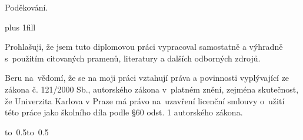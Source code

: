\documentclass[12pt,a4paper]{report}
\let\openright=\clearpage
\begin{document}
\newpage



\openright

\noindent
Poděkování.

\newpage


\vglue 0pt plus 1fill

\noindent
Prohlašuji, že jsem tuto diplomovou práci vypracoval samostatně a výhradně
s~použitím citovaných pramenů, literatury a dalších odborných zdrojů.

\medskip\noindent
Beru na~vědomí, že se na moji práci vztahují práva a povinnosti vyplývající
ze zákona č. 121/2000 Sb., autorského zákona v~platném znění, zejména skutečnost,
že Univerzita Karlova v Praze má právo na~uzavření licenční smlouvy o~užití této
práce jako školního díla podle §60 odst. 1 autorského zákona.

\vspace{10mm}

\hbox{\hbox to 0.5\hbox to 0.5}

\vspace{20mm}
\newpage

\end{document}

